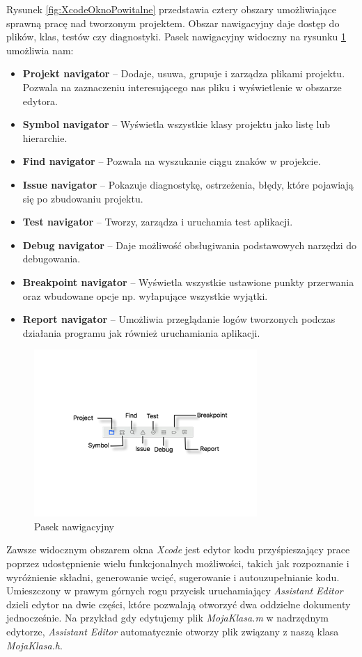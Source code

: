 \documentclass{iiuwb}
\begin{document}
Rysunek \ref{fig:XcodeOknoPowitalne} przedstawia cztery obszary umożliwiające sprawną pracę nad tworzonym projektem. Obszar nawigacyjny daje dostęp do plików, klas, testów czy diagnostyki. Pasek nawigacyjny widoczny na rysunku \ref{fig:XcodeNavigationBar} umożliwia nam:
\begin{itemize}
\item \textbf{Projekt navigator} -- Dodaje, usuwa, grupuje i zarządza plikami projektu. Pozwala na zaznaczeniu interesującego nas pliku i wyświetlenie w obszarze edytora. 
\item \textbf{Symbol navigator} -- Wyświetla wszystkie klasy projektu jako listę lub hierarchie.
\item \textbf{Find navigator} -- Pozwala na wyszukanie ciągu znaków w projekcie. 
\item \textbf{Issue navigator} -- Pokazuje diagnostykę, ostrzeżenia, błędy, które pojawiają się po zbudowaniu projektu.
\item \textbf{Test navigator} -- Tworzy, zarządza i uruchamia test aplikacji.
\item \textbf{Debug navigator} -- Daje możliwość obsługiwania podstawowych narzędzi do debugowania.
\item \textbf{Breakpoint navigator} -- Wyświetla wszystkie ustawione punkty przerwania oraz wbudowane opcje np. wyłapujące wszystkie wyjątki.
\item \textbf{Report navigator} -- Umożliwia przeglądanie logów tworzonych podczas działania programu jak również uruchamiania aplikacji.
\end{itemize}
\begin{figure}[!th]
\centering
\includegraphics[scale=.7]{image/XcodeNavigationBar.png}
\caption{Pasek nawigacyjny}
\label{fig:XcodeNavigationBar}
\end{figure}

Zawsze widocznym obszarem okna \textit{Xcode} jest edytor kodu przyśpieszający prace poprzez udostępnienie wielu funkcjonalnych możliwości, takich jak rozpoznanie i wyróżnienie składni, generowanie wcięć, sugerowanie i autouzupełnianie kodu. Umieszczony w prawym górnych rogu przycisk uruchamiający \textit{Assistant Editor} dzieli edytor na dwie części, które pozwalają otworzyć dwa oddzielne dokumenty jednocześnie. Na przykład gdy edytujemy plik \emph{MojaKlasa.m} w nadrzędnym edytorze, \textit{Assistant Editor} automatycznie otworzy plik związany z naszą klasa \emph{MojaKlasa.h}.
\end{document}
